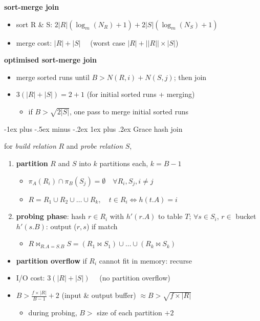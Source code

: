 \documentclass[10pt, landscape]{article}
\makeatletter
\renewcommand{\subsubsection}{\@startsection{subsubsection}{3}{0mm}%
  {-1ex plus -.5ex minus -.2ex}%
  {1ex plus .2ex}%
{\normalfont\small\bfseries}}%
\makeatother
\begin{document}
\begin{multicols*}{4}
  \textbf{sort-merge join}

  \begin{itemize}
    \item sort R \& S: $2|R| (\log_m(N_R)+1) + 2|S| (\log_m(N_S)+1)$
    \item merge cost: $|R| + |S| \quad$ (worst case $|R| + ||R||\times|S|$)
  \end{itemize}

  \textbf{optimised sort-merge join}

  \begin{itemize}
    \item merge sorted runs until $B > N(R, i) + N(S, j)$; then join
    \item $3(|R|+|S|) = 2+1$ (for initial sorted runs + merging)
      \begin{itemize}
        \item if $B > \sqrt{2|S|}$, one pass to merge initial sorted runs
      \end{itemize}
  \end{itemize}

  \subsubsection{Grace hash join}

  for \textit{build relation} $R$ and \textit{probe relation} $S$,
  \begin{enumerate}
    \item \textbf{partition} $R$ and $S$ into  $k$ partitions each, $k=B-1$
      \begin{itemize}
        \item $\pi_A(R_i) \cap \pi_B(S_j) = \emptyset \quad \forall R_i, S_j, i \neq j$
        \item $R = R_1 \cup R_2 \cup \dots \cup R_k, \quad t \in R_i \iff h(t.A)=i$
      \end{itemize}
    \item \textbf{probing phase}: hash $r \in R_i$ with $h'(r.A)$ to table $T$;
      $\forall s \in S_i$, $r \in$ bucket $h'(s.B)$: output ($r,s$) if match
      \begin{itemize}
        \item $R \bowtie_{R.A=S.B} S = (R_1 \bowtie S_1) \cup \dots \cup (R_k \bowtie S_k)$
      \end{itemize} 
  \end{enumerate}

  \begin{itemize}
    \item \textbf{partition overflow} if $R_i$ cannot fit in memory: recurse
    \item I/O cost: $3(|R|+|S|) \quad$ (no partition overflow)
    \item $B > \frac{f \times |R|}{B-1} + 2$ (input \& output buffer) $\approx B > \sqrt{f\times |R|}$
      \begin{itemize}
        \item during probing, $B >$ size of each partition $+ 2$
      \end{itemize}
  \end{itemize}


\end{multicols*}
\end{document}
